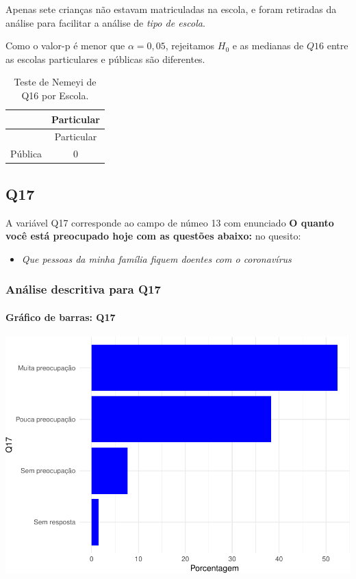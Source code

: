 \documentclass[]{article}
\providecommand{\tightlist}{%
  \setlength{\itemsep}{0pt}\setlength{\parskip}{0pt}}
\let\oldparagraph\paragraph
\renewcommand{\paragraph}[1]{\oldparagraph{#1}\mbox{}}
\begin{document}
Apenas sete crianças não estavam matriculadas na escola, e foram retiradas da análise para facilitar a análise de \emph{tipo de escola}.

Como o valor-p é menor que \(\alpha=0,05\), rejeitamos \(H_0\) e as medianas de \(Q16\) entre as escolas particulares e públicas são diferentes.

\begin{longtable}[]{@{}lc@{}}
\caption{\label{tab:unnamed-chunk-177}Teste de Nemeyi de Q16 por Escola.}\tabularnewline
\toprule
& Particular\tabularnewline
\midrule
\endfirsthead
\toprule
& Particular\tabularnewline
\midrule
\endhead
Pública & 0\tabularnewline
\bottomrule
\end{longtable}

\cleardoublepage

\hypertarget{q17}{%
\subsection{Q17}\label{q17}}

A variável Q17 corresponde ao campo de númeo 13 com enunciado \textbf{O quanto você está preocupado hoje com as questões abaixo:} no quesito:

\begin{itemize}
\tightlist
\item
  \emph{Que pessoas da minha família fiquem doentes com o coronavírus}
\end{itemize}

\hypertarget{anuxe1lise-descritiva-para-q17}{%
\subsubsection{Análise descritiva para Q17}\label{anuxe1lise-descritiva-para-q17}}

\hypertarget{gruxe1fico-de-barras-q17}{%
\paragraph{Gráfico de barras: Q17}\label{gruxe1fico-de-barras-q17}}

\begin{center}\includegraphics[width=0.75\linewidth]{relatorio_files/figure-latex/unnamed-chunk-178-1} \end{center}
\end{document}

